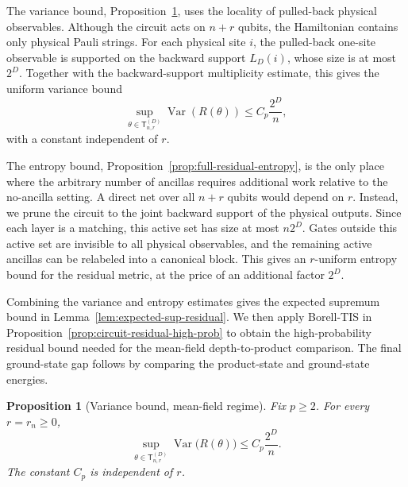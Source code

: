 \documentclass[12pt]{article}
\newtheorem{proposition}[theorem]{Proposition}
\begin{document}
The variance bound, Proposition~\ref{prop:full-residual-variance}, uses the locality of pulled-back physical observables.
Although the circuit acts on \(n+r\) qubits, the Hamiltonian contains only
physical Pauli strings. For each physical site \(i\), the pulled-back one-site observable is supported on the backward support \(L_D(i)\), whose size is at most \(2^D\). Together with the backward-support multiplicity estimate, this gives the uniform variance bound
\[
    \sup_{\theta\in\mathsf{T}_{n,r}^{(D)}}
    \operatorname{Var}(R(\theta))
    \le
    C_p\frac{2^D}{n},
\]
with a constant independent of $r$.

The entropy bound, Proposition~\ref{prop:full-residual-entropy}, is the only place where the arbitrary number of ancillas
requires additional work relative to the no-ancilla setting. A direct net over all \(n+r\) qubits would depend on $r$. Instead, we prune the circuit to the joint backward support of the
physical outputs. Since each layer is a matching, this active set has size at
most \(n2^D\). Gates outside this active set are invisible to all physical
observables, and the remaining active ancillas can be relabeled into a
canonical block. This gives an $r$-uniform entropy bound for the residual
metric, at the price of an additional factor \(2^D\). 

Combining the variance and entropy estimates gives the expected supremum bound in Lemma~\ref{lem:expected-sup-residual}. We then apply Borell-TIS in
Proposition~\ref{prop:circuit-residual-high-prob} to obtain the high-probability
residual bound needed for the mean-field depth-to-product comparison. The final
ground-state gap follows by comparing the product-state and ground-state
energies.

\begin{proposition}[Variance bound, mean-field regime]
\label{prop:full-residual-variance}
Fix \(p\ge2\). For every \(r=r_n\ge0\),
\[
    \sup_{\theta\in\mathsf{T}_{n,r}^{(D)}}
    \operatorname{Var}\bigl(R(\theta)\bigr)
    \le
    C_p\frac{2^D}{n}.
\]
The constant \(C_p\) is independent of $r$.
\end{proposition}
\end{document}
